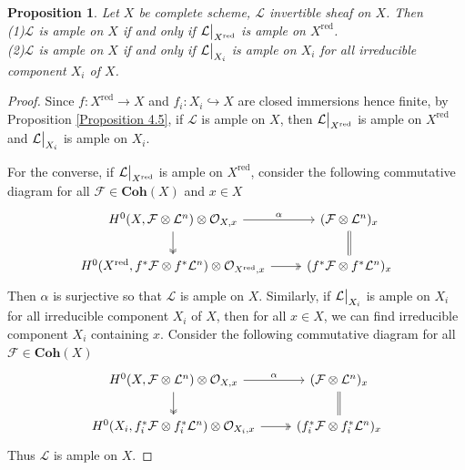 \documentclass{ctexart}
\newtheorem{proposition}{Proposition}[section]
\newcommand{\reduction}{\operatorname{red}}
\newcommand{\coherent}{\mathbf{Coh}}
\begin{document}
\begin{proposition}
    Let $X$ be complete scheme, $\mathcal{L}$ invertible sheaf on $X$.
    Then \\
    (1)$\mathcal{L}$ is ample on $X$ if and only if $\mathcal{L}\big{|}_{X^{\reduction}}$ is ample on $X^{\reduction}$. \\
    (2)$\mathcal{L}$ is ample on $X$ if and only if $\mathcal{L}\big{|}_{X_{i}}$ is ample on $X_{i}$ for all irreducible component $X_{i}$ of $X$.
    \vspace{-\baselineskip} %
    \label{Proposition 4.6}
\end{proposition}
\begin{proof}
    Since $f: X^{\reduction} \rightarrow X$ and $f_{i}: X_{i} \hookrightarrow X$ are closed immersions hence finite,
    by Proposition \ref{Proposition 4.5}, if $\mathcal{L}$ is ample on $X$,
    then $\mathcal{L}\big{|}_{X^{\reduction}}$ is ample on $X^{\reduction}$ and $\mathcal{L}\big{|}_{X_{i}}$ is ample on $X_{i}$.
    \par
    For the converse, if $\mathcal{L}\big{|}_{X^{\reduction}}$ is ample on $X^{\reduction}$,
    consider the following commutative diagram for all $\mathcal{F}\in \coherent (X)$ and $x\in X$
    \begin{equation}
        \begin{tikzcd}
            H^{0}(X, \mathcal{F} \otimes \mathcal{L}^{n}) \otimes \mathcal{O}_{X, x} \arrow[r, "\alpha"] \arrow[d, twoheadrightarrow] &
            (\mathcal{F} \otimes \mathcal{L}^{n})_{x} \arrow[d, equal] \\
            H^{0}(X^{\reduction}, f^{\ast}\mathcal{F} \otimes f^{\ast}\mathcal{L}^{n}) \otimes \mathcal{O}_{X^{\reduction}, x} \arrow[r, twoheadrightarrow] &
            (f^{\ast}\mathcal{F} \otimes f^{\ast}\mathcal{L}^{n})_{x}
        \end{tikzcd}
    \end{equation}
    Then $\alpha$ is surjective so that $\mathcal{L}$ is ample on $X$.
    Similarly, if $\mathcal{L}\big{|}_{X_{i}}$ is ample on $X_{i}$ for all irreducible component $X_{i}$ of $X$,
    then for all $x\in X$, we can find irreducible component $X_{i}$ containing $x$.
    Consider the following commutative diagram for all $\mathcal{F}\in \coherent (X)$
    \begin{equation}
        \begin{tikzcd}
            H^{0}(X, \mathcal{F} \otimes \mathcal{L}^{n}) \otimes \mathcal{O}_{X, x} \arrow[r, "\alpha"] \arrow[d, twoheadrightarrow] &
            (\mathcal{F} \otimes \mathcal{L}^{n})_{x} \arrow[d, equal] \\
            H^{0}(X_{i}, f_{i}^{\ast}\mathcal{F} \otimes f_{i}^{\ast}\mathcal{L}^{n}) \otimes \mathcal{O}_{X_{i}, x} \arrow[r, twoheadrightarrow] &
            (f_{i}^{\ast}\mathcal{F} \otimes f_{i}^{\ast}\mathcal{L}^{n})_{x}
        \end{tikzcd}
    \end{equation}
    Thus $\mathcal{L}$ is ample on $X$.
\end{proof}
\end{document}

